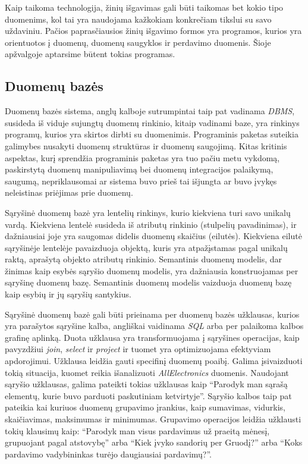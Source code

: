 Kaip taikoma technologija, žinių išgavimas gali būti taikomas bet kokio tipo duomenims, kol tai yra naudojama kažkokiam konkrečiam tikslui su savo uždaviniu.
Pačios paprasčiausios žinių išgavimo formos yra programos, kurios yra orientuotos į duomenų, duomenų saugyklos ir perdavimo duomenis.
Šioje apžvalgoje aptarsime būtent tokias programas.

\subsection{Duomenų bazės}

Duomenų bazės sistema, anglų kalboje sutrumpintai taip pat vadinama \textit{DBMS}, susideda iš viduje sujungtų duomenų rinkinio, kitaip vadinami baze, yra rinkinys programų, kurios yra skirtos dirbti su duomenimis.
Programinis paketas suteikia galimybes nusakyti duomenų struktūras ir duomenų saugojimą. Kitas kritinis aspektas, kurį sprendžia programinis paketas yra tuo pačiu metu vykdomą, paskirstytą duomenų manipuliavimą bei duomenų integracijos palaikymą, saugumą, nepriklausomai ar sistema buvo prieš tai išjungta ar buvo įvykęs neleistinas priėjimas prie duomenų.

Sąryšinė duomenų bazė yra lentelių rinkinys, kurio kiekviena turi savo unikalų vardą. Kiekviena lentelė susideda iš atributų rinkinio (stulpelių pavadinimas), ir dažniausiai joje yra saugomas didelis duomenų skaičius (eilutės). 
Kiekviena eilutė sąryšinėje lentelėje pavaizduoja objektą, kuris yra atpažįstamas pagal unikalų raktą, aprašytą objekto atributų rinkinio. 
Semantinis duomenų modelis, dar žinimas kaip esybės sąryšio duomenų modelis, yra dažniausia konstruojamas per sąryšinę duomenų bazę.
Semantinis duomenų modelis vaizduoja duomenų bazę kaip esybių ir jų sąryšių santykius.

Sąryšinė duomenų bazė gali būti prieinama per duomenų bazės užklausas, kurios yra parašytos sąryšine kalba, angliškai vaidinama \textit{SQL} arba per palaikoma kalbos grafinę aplinką. 
Duota užklausa yra transformuojama į sąryšines operacijas, kaip pavyzdžiui \textit{join}, \textit{select} ir \textit{project} ir tuomet yra optimizuojama efektyviam apdorojimui.
Užklausa leidžia gauti specifinį duomenų poaibį.
Galima įsivaizduoti tokią situacija, kuomet reikia išanalizuoti \textit{AllElectronics} duomenis. 
Naudojant sąryšio užklausas, galima pateikti tokias užklausas kaip ``Parodyk man sąrašą elementų, kurie buvo parduoti paskutiniam ketvirtyje''. 
Sąryšio kalbos taip pat pateikia kai kuriuos duomenų grupavimo įrankius, kaip sumavimas, vidurkis, skaičiavimas, maksimumas ir minimumas.
Grupavimo operacijos leidžia užklausti tokių klausimų kaip: ``Parodyk man visus pardavimus už praeitą mėnesį, grupuojant pagal atstovybę'' arba ``Kiek įvyko sandorių per Gruodį?'' arba ``Koks pardavimo vadybininkas turėjo daugiausiai pardavimų?''.

